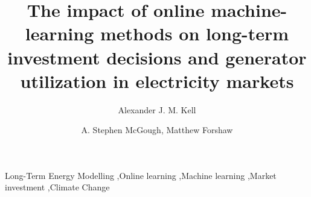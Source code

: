 \documentclass[final,3p,times,twocolumn,numbers]{elsarticle}
\begin{document}
\begin{frontmatter}


 \title{The impact of online machine-learning methods on long-term investment decisions and generator utilization in electricity markets}
 \author{Alexander J. M. Kell}



\author{A. Stephen McGough, Matthew Forshaw}

\address{School of Computing, Newcastle University, Newcastle-upon-Tyne, United Kingdom}

\begin{abstract}

\end{abstract}
%
%

\begin{keyword}
Long-Term Energy Modelling \sep Online learning \sep Machine learning \sep Market investment \sep Climate Change


\end{keyword}

\end{frontmatter}
\end{document}
